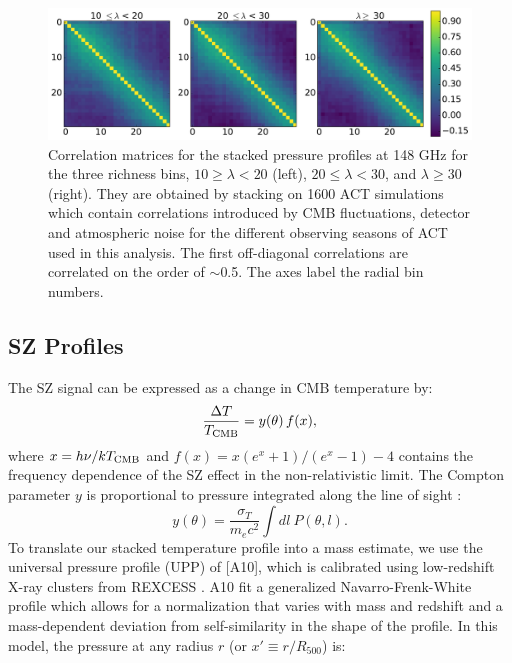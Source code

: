 \documentclass[a4paper,fleqn,usenatbib]{mnras}
\begin{document}
\begin{figure}
\centering
  \includegraphics[width=1.75\columnwidth]{correlation_1600_coadd_act_actpol_148_tophat_zbin01_all.pdf}
  \caption{Correlation matrices for the stacked pressure profiles at 148 GHz for the three richness bins, $10 \geq \lambda < 20$ (left), $20 \leq \lambda < 30$, and $\lambda \geq 30$ (right). They are obtained by stacking on 1600 ACT simulations which contain correlations introduced by CMB fluctuations, detector and atmospheric noise for the different observing seasons of ACT used in this analysis. The first off-diagonal correlations are correlated on the order of $\sim$0.5. The axes label the radial bin numbers.}
  \label{fig:covariance}
\end{figure}

\subsection{SZ Profiles}
The SZ signal can be expressed as a change in CMB temperature by: 
\begin{equation}
\centering
  \frac{\Delta T}{T_{\rm CMB}} = y( \theta ) \, f( x ) ,
\end{equation}
where $x = {h \nu}/{k T_{\rm CMB}}$ and $f(x) = x ({e^{x} + 1})/{(e^{x}-1)} - 4$ contains the frequency dependence of the SZ effect in the non-relativistic limit. The Compton parameter $y$ is proportional to pressure integrated along the line of sight \citep{1972CoASP...4..173S,1970CoASP...2...66S}:
\begin{equation}
  y(\theta) = \frac{\sigma_{T}}{m_{e} c^{2}} \int dl\  P(\theta, l) . \end{equation}
To translate our stacked temperature profile into a mass estimate, we use the universal pressure profile (UPP) of \cite{2010A&A...517A..92A} [A10], which is calibrated using low-redshift X-ray clusters from REXCESS \citep{2007A&A...469..363B}. 
A10 fit a generalized Navarro-Frenk-White profile which allows for a normalization that varies with mass and redshift and a mass-dependent deviation from self-similarity in the shape of the profile. 
In this model, the pressure at any radius $r$ (or $x' \equiv r/R_{500}$) is:
\end{document}
